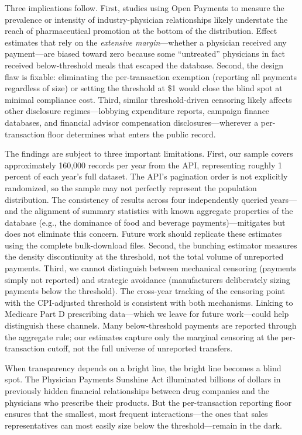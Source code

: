 \documentclass[12pt]{article}
\begin{document}
Three implications follow. First, studies using Open Payments to measure the prevalence or intensity of industry-physician relationships likely understate the reach of pharmaceutical promotion at the bottom of the distribution. Effect estimates that rely on the \emph{extensive margin}---whether a physician received any payment---are biased toward zero because some ``untreated'' physicians in fact received below-threshold meals that escaped the database. Second, the design flaw is fixable: eliminating the per-transaction exemption (reporting all payments regardless of size) or setting the threshold at \$1 would close the blind spot at minimal compliance cost. Third, similar threshold-driven censoring likely affects other disclosure regimes---lobbying expenditure reports, campaign finance databases, and financial advisor compensation disclosures---wherever a per-transaction floor determines what enters the public record.

The findings are subject to three important limitations. First, our sample covers approximately 160,000 records per year from the API, representing roughly 1 percent of each year's full dataset. The API's pagination order is not explicitly randomized, so the sample may not perfectly represent the population distribution. The consistency of results across four independently queried years---and the alignment of summary statistics with known aggregate properties of the database (e.g., the dominance of food and beverage payments)---mitigates but does not eliminate this concern. Future work should replicate these estimates using the complete bulk-download files. Second, the bunching estimator measures the density discontinuity at the threshold, not the total volume of unreported payments. Third, we cannot distinguish between mechanical censoring (payments simply not reported) and strategic avoidance (manufacturers deliberately sizing payments below the threshold). The cross-year tracking of the censoring point with the CPI-adjusted threshold is consistent with both mechanisms. Linking to Medicare Part D prescribing data---which we leave for future work---could help distinguish these channels. Many below-threshold payments are reported through the aggregate rule; our estimates capture only the marginal censoring at the per-transaction cutoff, not the full universe of unreported transfers.

When transparency depends on a bright line, the bright line becomes a blind spot. The Physician Payments Sunshine Act illuminated billions of dollars in previously hidden financial relationships between drug companies and the physicians who prescribe their products. But the per-transaction reporting floor ensures that the smallest, most frequent interactions---the ones that sales representatives can most easily size below the threshold---remain in the dark.
\end{document}
